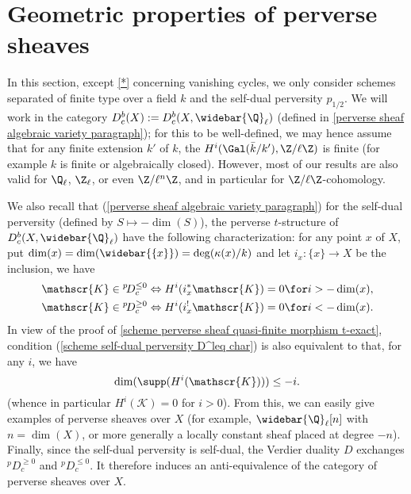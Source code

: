 \section{Geometric properties of perverse sheaves}\label{scheme perverse sheaf geometric property section}
In this section, except \autoref{*} concerning vanishing cycles, we only consider schemes separated of finite type over a field $k$ and the self-dual perversity $p_{1/2}$. We will work in the category $D^b_c(X):=D^b_c(X,\widebar{\Q}_\ell)$ (defined in \ref{perverse sheaf algebraic variety paragraph}); for this to be well-defined, we may hence assume that for any finite extension $k'$ of $k$, the $H^i(\Gal(\bar{k}/k'),\Z/\ell\Z)$ is finite (for example $k$ is finite or algebraically closed). However, most of our results are also valid for $\Q_\ell$, $\Z_\ell$, or even $\Z/\ell^n\Z$, and in particular for $\Z/\ell\Z$-cohomology.\par
We also recall that (\ref{perverse sheaf algebraic variety paragraph}) for the self-dual perversity (defined by $S\mapsto-\dim(S)$), the perverse $t$-structure of $D^b_c(X,\widebar{\Q}_\ell)$ have the following characterization: for any point $x$ of $X$, put $\dim(x)=\dim(\widebar{\{x\}})=\deg(\kappa(x)/k)$ and let $i_x:\{x\}\to X$ be the inclusion, we have
\begin{align}
\mathscr{K}\in {^p\!D^{\leq 0}_c}\Leftrightarrow H^i(i_x^*\mathscr{K})=0\for i>-\dim(x)\label{scheme self-dual perversity D^leq char},\\
\mathscr{K}\in {^p\!D^{\geq 0}_c}\Leftrightarrow H^i(i_x^!\mathscr{K})=0\for i<-\dim(x)\label{scheme self-dual perversity D^geq char}.
\end{align}
In view of the proof of \cref{scheme perverse sheaf quasi-finite morphism t-exact}, condition (\ref{scheme self-dual perversity D^leq char}) is also equivalent to that, for any $i$, we have 
\begin{equation}\label{scheme self-dual perversity D^leq char by dimension supp}
\dim(\supp(H^i(\mathscr{K})))\leq -i.
\end{equation}
(whence in particular $H^i(\mathscr{K})=0$ for $i>0$). From this, we can easily give examples of perverse sheaves over $X$ (for example, $\widebar{\Q}_\ell[n]$ with $n=\dim(X)$, or more generally a locally constant sheaf placed at degree $-n$). Finally, since the self-dual perversity is self-dual, the Verdier duality $D$ exchanges ${^p\!D_c^{\geq 0}}$ and ${^p\!D_c^{\leq 0}}$. It therefore induces an anti-equivalence of the category of perverse sheaves over $X$.

